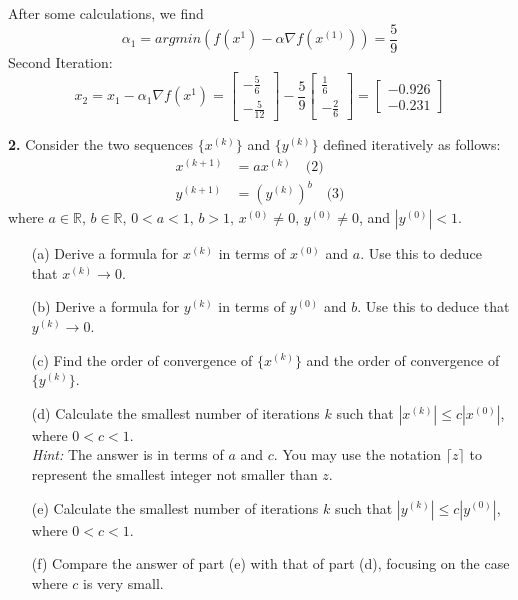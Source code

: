 \documentclass[12pt]{article}
\begin{document}
After some calculations, we find \[\alpha_1 = argmin(f(x^1) - \alpha \nabla f(x^{(1)})) = \frac{5}{9}\]
Second Iteration:
\[
x_2 = x_1 - \alpha_1\nabla f(x^1) = \begin{bmatrix}
  -\frac{5}{6} \\ -\frac{5}{12}
\end{bmatrix} - \frac{5}{9} \begin{bmatrix}
  \frac{1}{6} \\ -\frac{2}{6}
\end{bmatrix} = \begin{bmatrix}
   -0.926\\-0.231
\end{bmatrix}
\]
\bigbreak
\begin{mybluebox}
  \textbf{2.} Consider the two sequences $\{x^{(k)}\}$ and $\{y^{(k)}\}$ defined iteratively as follows:
\begin{align}
    x^{(k+1)} &= ax^{(k)} \quad \text{(2)} \\
    y^{(k+1)} &= \left(y^{(k)}\right)^b \quad \text{(3)}
\end{align}
where $a \in \mathbb{R}, \, b \in \mathbb{R}, \, 0 < a < 1, \, b > 1, \, x^{(0)} \neq 0, \, y^{(0)} \neq 0$, and $|y^{(0)}| < 1$.

\begin{itemize}
    \item[(a)] Derive a formula for $x^{(k)}$ in terms of $x^{(0)}$ and $a$. Use this to deduce that $x^{(k)} \to 0$.
    \item[(b)] Derive a formula for $y^{(k)}$ in terms of $y^{(0)}$ and $b$. Use this to deduce that $y^{(k)} \to 0$.
    \item[(c)] Find the order of convergence of $\{x^{(k)}\}$ and the order of convergence of $\{y^{(k)}\}$.
    \item[(d)] Calculate the smallest number of iterations $k$ such that $|x^{(k)}| \leq c |x^{(0)}|$, where $0 < c < 1$.\\
    \textit{Hint:} The answer is in terms of $a$ and $c$. You may use the notation $\lceil z \rceil$ to represent the smallest integer not smaller than $z$.
    \item[(e)] Calculate the smallest number of iterations $k$ such that $|y^{(k)}| \leq c |y^{(0)}|$, where $0 < c < 1$.
    \item[(f)] Compare the answer of part (e) with that of part (d), focusing on the case where $c$ is very small.
\end{itemize}
\end{mybluebox}
\end{document}
